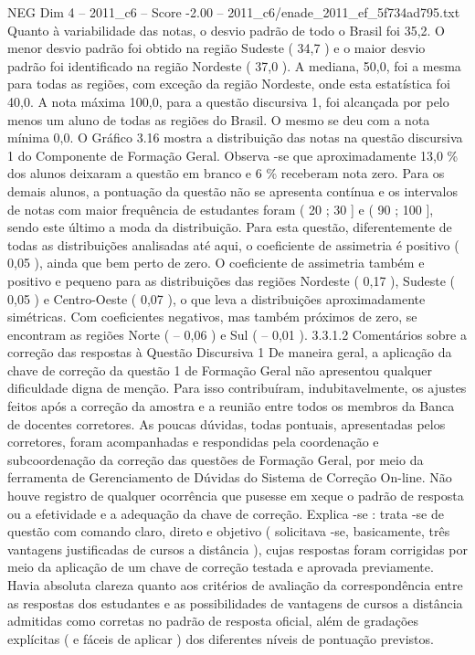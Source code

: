 \begin{textsample}{NEG Dim 4 – 2011\_c6 – Score -2.00 – 2011\_c6/enade\_2011\_ef\_5f734ad795.txt}
Quanto à variabilidade das notas, o desvio padrão de todo o Brasil foi 35,2.
O menor desvio padrão foi obtido na região Sudeste ( 34,7 ) e o maior desvio padrão foi identificado na região Nordeste ( 37,0 ).
A mediana, 50,0, foi a mesma para todas as regiões, com exceção da região Nordeste, onde esta estatística foi 40,0.
A nota máxima 100,0, para a questão discursiva 1, foi alcançada por pelo menos um aluno de todas as regiões do Brasil.
O mesmo se deu com a nota mínima 0,0.
O Gráfico 3.16 mostra a distribuição das notas na questão discursiva 1 do Componente de Formação Geral.
Observa -se que aproximadamente 13,0 \% dos alunos deixaram a questão em branco e 6 \% receberam nota zero.
Para os demais alunos, a pontuação da questão não se apresenta contínua e os intervalos de notas com maior frequência de estudantes foram ( 20 ; 30 ] e ( 90 ; 100 ], sendo este último a moda da distribuição.
Para esta questão, diferentemente de todas as distribuições analisadas até aqui, o coeficiente de assimetria é positivo ( 0,05 ), ainda que bem perto de zero.
O coeficiente de assimetria também e positivo e pequeno para as distribuições das regiões Nordeste ( 0,17 ), Sudeste ( 0,05 ) e Centro-Oeste ( 0,07 ), o que leva a distribuições aproximadamente simétricas.
Com coeficientes negativos, mas também próximos de zero, se encontram as regiões Norte ( – 0,06 ) e Sul ( – 0,01 ). 3.3.1.2 Comentários sobre a correção das respostas à Questão Discursiva 1 De maneira geral, a aplicação da chave de correção da questão 1 de Formação Geral não apresentou qualquer dificuldade digna de menção.
Para isso contribuíram, indubitavelmente, os ajustes feitos após a correção da amostra e a reunião entre todos os membros da Banca de docentes corretores.
As poucas dúvidas, todas pontuais, apresentadas pelos corretores, foram acompanhadas e respondidas pela coordenação e subcoordenação da correção das questões de Formação Geral, por meio da ferramenta de Gerenciamento de Dúvidas do Sistema de Correção On-line.
Não houve registro de qualquer ocorrência que pusesse em xeque o padrão de resposta ou a efetividade e a adequação da chave de correção.
Explica -se : trata -se de questão com comando claro, direto e objetivo ( solicitava -se, basicamente, três vantagens justificadas de cursos a distância ), cujas respostas foram corrigidas por meio da aplicação de um chave de correção testada e aprovada previamente.
Havia absoluta clareza quanto aos critérios de avaliação da correspondência entre as respostas dos estudantes e as possibilidades de vantagens de cursos a distância admitidas como corretas no padrão de resposta oficial, além de gradações explícitas ( e fáceis de aplicar ) dos diferentes níveis de pontuação previstos.

\end{textsample}
